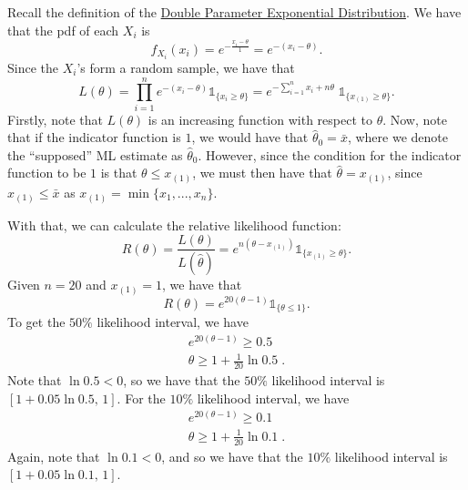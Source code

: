 \documentclass[notoc,notitlepage]{tufte-book}
\begin{document}
\begin{solution}
  Recall the definition of the \hyperref[defn:double_parameter_exponential_distribution]{Double Parameter Exponential Distribution}. We have that the pdf of each $X_i$ is
  \begin{equation*}
    f_{X_i}(x_i) = e^{- \frac{x_i - \theta}{1}} = e^{- ( x_i - \theta )}.
  \end{equation*}
  Since the $X_i$'s form a random sample, we have that
  \begin{equation*}
    L(\theta) = \prod_{i=1}^{n} e^{- ( x_i - \theta )} \mathbb{1}_{\{x_i \geq \theta\}} = e^{- \sum_{i=1}^{n} x_i + n \theta} \; \mathbb{1}_{\{x_{(1)} \geq \theta\}}.
  \end{equation*}
  Firstly, note that $L(\theta)$ is an increasing function with respect to $\theta$. Now, note that if the indicator function is $1$, we would have that $\hat{\theta}_0 = \bar{x}$, where we denote the ``supposed'' ML estimate as $\hat{\theta}_0$. However, since the condition for the indicator function to be $1$ is that $\theta \leq x_{(1)}$, we must then have that $\hat{\theta} = x_{(1)}$, since $x_{(1)} \leq \bar{x}$ as $x_{(1)} = \min\{x_1, ..., x_n\}$.

  With that, we can calculate the relative likelihood function:
  \begin{equation*}
    R(\theta) = \frac{L(\theta)}{L(\hat{\theta})} = e^{n \left( \theta - x_{(1)} \right)} \mathbb{1}_{\{x_{(1)} \geq \theta\}}.
  \end{equation*}
  Given $n = 20$ and $x_{(1)} = 1$, we have that
  \begin{equation*}
    R(\theta) = e^{20 (\theta - 1)} \mathbb{1}_{\{\theta \leq 1\}}.
  \end{equation*}
  To get the $50\%$ likelihood interval, we have
  \begin{gather*}
    e^{20(\theta - 1)} \geq 0.5 \\
    \theta \geq 1 + \frac{1}{20} \ln 0.5 \; .
  \end{gather*}
  Note that $\ln 0.5 < 0$, so we have that the $50\%$ likelihood interval is $[1 + 0.05 \ln 0.5, \, 1]$.
  For the $10\%$ likelihood interval, we have
  \begin{gather*}
    e^{20(\theta - 1)} \geq 0.1 \\
    \theta \geq 1 + \frac{1}{20} \ln 0.1 \; .
  \end{gather*}
  Again, note that $\ln 0.1 < 0$, and so we have that the $10\%$ likelihood interval is $[1 + 0.05 \ln 0.1, \, 1]$.
\end{solution}
\end{document}
